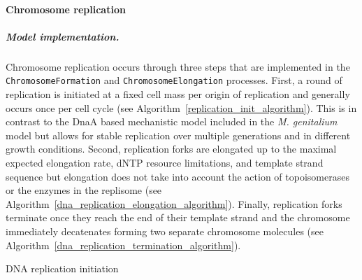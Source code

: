 \documentclass[12pt]{article}
\begin{document}
\baselineskip24pt

\paragraph{Chromosome replication}

\subparagraph{Model implementation.}
Chromosome replication occurs through three steps that are implemented in the \texttt{ChromosomeFormation} and \texttt{ChromosomeElongation} processes. First, a round of replication is initiated at a fixed cell mass per origin of replication and generally occurs once per cell cycle (see Algorithm~\ref{replication_init_algorithm}). This is in contrast to the DnaA based mechanistic model included in the \textit{M. genitalium} model but allows for stable replication over multiple generations and in different growth conditions. Second, replication forks are elongated up to the maximal expected elongation rate, dNTP resource limitations, and template strand sequence but elongation does not take into account the action of topoisomerases or the enzymes in the replisome (see Algorithm~\ref{dna_replication_elongation_algorithm}). Finally, replication forks terminate once they reach the end of their template strand and the chromosome immediately decatenates forming two separate chromosome molecules  (see Algorithm~\ref{dna_replication_termination_algorithm}).\\


\begin{algorithm}[H]
\caption{DNA replication initiation}
\label{replication_init_algorithm}



\end{algorithm}
\end{document}
